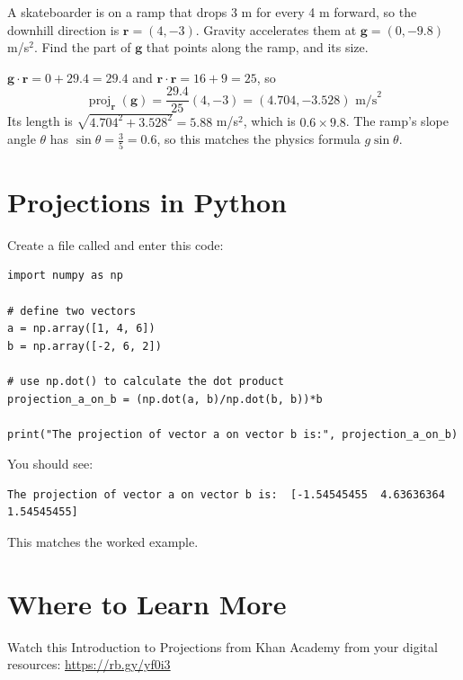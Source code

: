 \begin{Exercise}[title={Sliding Down a Ramp}, label=projections3]
A skateboarder is on a ramp that drops 3 m for every 4 m forward, so the
downhill direction is $\mathbf{r} = (4, -3)$. Gravity accelerates them at
$\mathbf{g} = (0, -9.8)$ m/s$^2$. Find the part of $\mathbf{g}$ that points
along the ramp, and its size.
\end{Exercise}
\begin{Answer}[ref=projections3]
$\mathbf{g} \cdot \mathbf{r} = 0 + 29.4 = 29.4$ and $\mathbf{r} \cdot
\mathbf{r} = 16 + 9 = 25$, so
$$\operatorname{proj}_{\mathbf{r}}(\mathbf{g}) = \frac{29.4}{25}(4, -3) = (4.704, -3.528) \text{ m/s}^2$$
Its length is $\sqrt{4.704^2 + 3.528^2} = 5.88$ m/s$^2$, which is $0.6
\times 9.8$. The ramp's slope angle $\theta$ has $\sin\theta = \frac{3}{5}
= 0.6$, so this matches the physics formula $g\sin\theta$.
\end{Answer}

\section{Projections in Python}

Create a file called  and enter this code:
\begin{verbatim}
import numpy as np

# define two vectors  
a = np.array([1, 4, 6])   
b = np.array([-2, 6, 2])  
  
# use np.dot() to calculate the dot product
projection_a_on_b = (np.dot(a, b)/np.dot(b, b))*b
  
print("The projection of vector a on vector b is:", projection_a_on_b)
\end{verbatim}

You should see:
\begin{verbatim}
The projection of vector a on vector b is:  [-1.54545455  4.63636364  1.54545455]
\end{verbatim}
This matches the worked example.

\section{Where to Learn More}

Watch this Introduction to Projections from Khan Academy from your digital resources:
\url{https://rb.gy/yf0i3}

